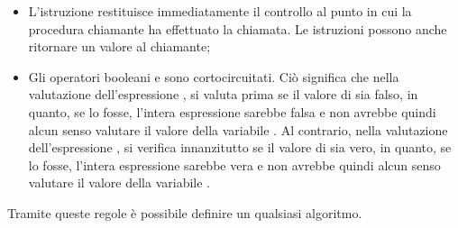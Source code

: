 \begin{itemize}
  \item L'istruzione  restituisce immediatamente il controllo al punto in cui la procedura chiamante ha effettuato la chiamata. Le istruzioni  possono anche ritornare un valore al chiamante;
  \item Gli operatori booleani  e  sono cortocircuitati. Ciò significa che nella valutazione dell'espressione , si valuta prima se il valore di  sia falso, in quanto, se lo fosse, l'intera espressione sarebbe falsa e non avrebbe quindi alcun senso valutare il valore della variabile . Al contrario, nella valutazione dell'espressione , si verifica innanzitutto se il valore di  sia vero, in quanto, se lo fosse, l'intera espressione sarebbe vera e non avrebbe quindi alcun senso valutare il valore della variabile .
\end{itemize}

Tramite queste regole è possibile definire un qualsiasi algoritmo.
